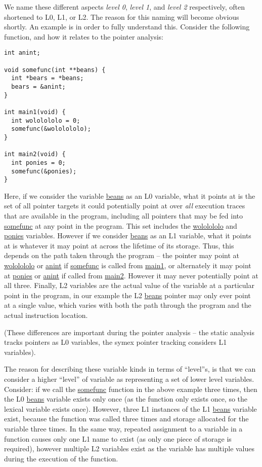 \documentclass{article}
\begin{document}
We name these different aspects \textit{level 0}, \textit{level 1}, and
\textit{level 2} respectively, often shortened to L0, L1, or L2. The reason
for this naming will become obvious shortly. An example is in order to fully
understand this. Consider the following function, and how it relates to the
pointer analysis:

\lstset{numbers=left}
\begin{lstlisting}
int anint;

void somefunc(int **beans) {
  int *bears = *beans;
  bears = &anint;
}

int main1(void) {
  int wololololo = 0;
  somefunc(&wololololo);
}

int main2(void) {
  int ponies = 0;
  somefunc(&ponies);
}
\end{lstlisting}

Here, if we consider the variable \url{beans} as an L0 variable, what it
points at is the set of all pointer targets it could potentially point at over
\textit{all} execution traces that are available in the program, including
all pointers that may be fed into \url{somefunc} at any point in the
program. This set includes the \url{wololololo} and \url{ponies}
variables. However if we consider \url{beans} as an L1 variable, what it
points at is whatever it may point at across the lifetime of its storage. Thus,
this depends on the path taken through the program -- the pointer may point
at \url{wololololo} or \url{anint} if \url{somefunc} is called from
\url{main1}, or alternately it may point at \url{ponies} or \url{anint}
if called from \url{main2}. However it may never potentially point at all
three. Finally, L2 variables are the actual value of the variable at a
particular point in the program, in our example the L2 \url{beans} pointer
may only ever point at a single value, which varies with both the path through
the program and the actual instruction location.

(These differences are important during the pointer analysis -- the static
analysis tracks pointers as L0 variables, the symex pointer tracking considers
L1 variables).

The reason for describing these variable kinds in terms of ``level''s, is
that we can consider a higher ``level'' of variable as representing a set of
lower level variables. Consider: if we call the \url{somefunc} function
in the above example three times, then the L0 \url{beans} variable exists
only once (as the function only exists once, so the lexical variable exists
once). However, three L1 instances of the L1 \url{beans} variable exist,
because the function was called three times and storage allocated for the
variable three times. In the same way, repeated assignment to a variable
in a function causes only one L1 name to exist (as only one piece of storage
is required), however multiple L2 variables exist as the variable has
multiple values during the execution of the function.
\end{document}
